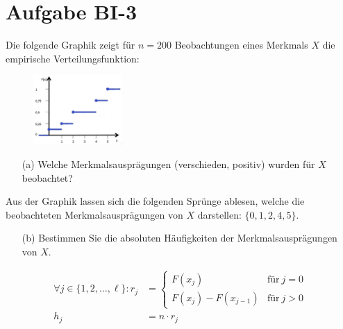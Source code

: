 
\section{Aufgabe BI-3}

\begin{task}
    Die folgende Graphik zeigt für $n=200$ Beobachtungen eines Merkmals $X$ die empirische Verteilungsfunktion:

    \begin{figure}[H]
        \begin{center}
            \includegraphics[width=0.3\textwidth]{assets/task3.png}
        \end{center}
    \end{figure}

    \begin{enumerate}
        \item[(a)] Welche Merkmalsausprägungen (verschieden, positiv) wurden für $X$ beobachtet?
    \end{enumerate}
\end{task}

Aus der Graphik lassen sich die folgenden Sprünge ablesen, welche die beobachteten Merkmalsausprägungen von $X$ darstellen: $\lbrace 0, 1, 2, 4, 5 \rbrace$.

\begin{task}
    \begin{enumerate}
        \item[(b)] Bestimmen Sie die absoluten Häufigkeiten der Merkmalsausprägungen von $X$.
    \end{enumerate}
\end{task}

$$
\begin{aligned}
    \forall j\in\lbrace 1,2,\ldots,\ell\rbrace:
    r_j &= \begin{cases}
        F(x_j)              &\text{für}~j=0 \\
        F(x_j) - F(x_{j-1}) &\text{für}~j>0
    \end{cases} \\
    h_j &= n\cdot r_j
\end{aligned}
$$

